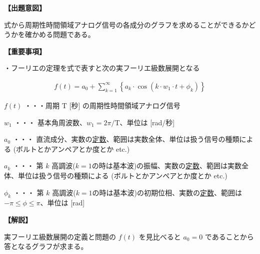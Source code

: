 \noindent \textbf{【出題意図】}

\noindent 式から周期性時間領域アナログ信号の各成分のグラフを求めることができるかどうかを確かめる問題である。

\vspace{1em}
\noindent \textbf{【重要事項】}

\medskip
\noindent ・フーリエの定理を式で表すと次の実フーリエ級数展開となる

\begin{align*}
f(t) = a_0 + \sum_{k=1}^{\infty}
\left \{
a_k \cdot \cos (k \cdot w_1 \cdot t + \phi_k)
\right \}
\end{align*}

\medskip
\noindent $f(t)$ ・・・周期 $\textrm{T}$ [秒] の周期性時間領域アナログ信号

\medskip
\noindent $w_1$ ・・・ 基本角周波数、$w_1 = 2\pi/\textrm{T}$、単位は [rad/秒]

\medskip
\noindent $a_0$ ・・・ 直流成分、実数の\underline{定数}、範囲は実数全体、単位は扱う信号の種類による (ボルトとかアンペアとか度とか etc.)

\medskip
\noindent $a_k$ ・・・ 第 $k$ 高調波($k=1$の時は基本波)の振幅、実数の\underline{定数}、範囲は実数全体、単位は扱う信号の種類による (ボルトとかアンペアとか度とか etc.)

\medskip
\noindent $\phi_k$ ・・・ 第 $k$ 高調波($k=1$の時は基本波)の初期位相、実数の\underline{定数}、範囲は $-\pi \leq \phi \leq \pi$、単位は [rad]


\vspace{1em}
\noindent \textbf{【解説】}

\noindent 実フーリエ級数展開の定義と問題の $f(t)$ を見比べると $a_0 = 0$ であることから答となるグラフが求まる。
